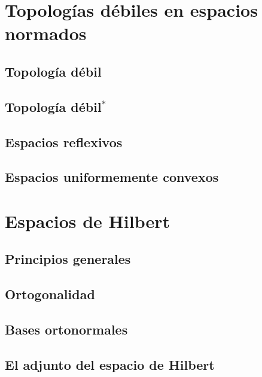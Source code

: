 \documentclass[12pt,]{krantz}
\theoremstyle{definition}
\theoremstyle{definition}
\theoremstyle{definition}
\theoremstyle{remark}
\begin{document}
\chapter{Topologías débiles en espacios
normados}\label{topologias-debiles-en-espacios-normados}

\section{Topología débil}\label{topologia-debil}

\section{\texorpdfstring{Topología
débil\(^*\)}{Topología débil\^{}*}}\label{topologia-debil-1}

\section{Espacios reflexivos}\label{espacios-reflexivos-1}

\section{Espacios uniformemente
convexos}\label{espacios-uniformemente-convexos}

\chapter{Espacios de Hilbert}\label{espacios-de-hilbert-1}

\section{Principios generales}\label{principios-generales}

\section{Ortogonalidad}\label{ortogonalidad-1}

\section{Bases ortonormales}\label{bases-ortonormales}

\section{El adjunto del espacio de
Hilbert}\label{el-adjunto-del-espacio-de-hilbert}
\end{document}
